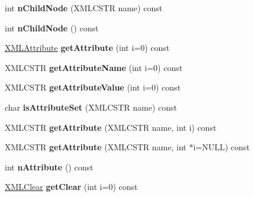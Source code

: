 \begin{DoxyCompactItemize}
\item 
\hypertarget{struct_x_m_l_node_a37dfb85db6b3e8974474c9a6277fff94}{}\label{struct_x_m_l_node_a37dfb85db6b3e8974474c9a6277fff94} 
int {\bfseries n\+Child\+Node} (X\+M\+L\+C\+S\+TR name) const
\item 
\hypertarget{struct_x_m_l_node_a89884092225798f347305956c1ecc62b}{}\label{struct_x_m_l_node_a89884092225798f347305956c1ecc62b} 
int {\bfseries n\+Child\+Node} () const
\item 
\hypertarget{struct_x_m_l_node_a50cc434e59c5f24f70eec2ae4b0554ab}{}\label{struct_x_m_l_node_a50cc434e59c5f24f70eec2ae4b0554ab} 
\hyperlink{struct_x_m_l_attribute}{X\+M\+L\+Attribute} {\bfseries get\+Attribute} (int i=0) const
\item 
\hypertarget{struct_x_m_l_node_a6710fba2ad2ca7c79c3e5d17a2101e08}{}\label{struct_x_m_l_node_a6710fba2ad2ca7c79c3e5d17a2101e08} 
X\+M\+L\+C\+S\+TR {\bfseries get\+Attribute\+Name} (int i=0) const
\item 
\hypertarget{struct_x_m_l_node_a48375d3bbdff5a0f416f668498edd3cb}{}\label{struct_x_m_l_node_a48375d3bbdff5a0f416f668498edd3cb} 
X\+M\+L\+C\+S\+TR {\bfseries get\+Attribute\+Value} (int i=0) const
\item 
\hypertarget{struct_x_m_l_node_a0bf031a1bca5c211810eb3420595589e}{}\label{struct_x_m_l_node_a0bf031a1bca5c211810eb3420595589e} 
char {\bfseries is\+Attribute\+Set} (X\+M\+L\+C\+S\+TR name) const
\item 
\hypertarget{struct_x_m_l_node_a5b66e8469c1f6c3398993e38981ead13}{}\label{struct_x_m_l_node_a5b66e8469c1f6c3398993e38981ead13} 
X\+M\+L\+C\+S\+TR {\bfseries get\+Attribute} (X\+M\+L\+C\+S\+TR name, int i) const
\item 
\hypertarget{struct_x_m_l_node_aed21862233be12773795cf6f3b9feeed}{}\label{struct_x_m_l_node_aed21862233be12773795cf6f3b9feeed} 
X\+M\+L\+C\+S\+TR {\bfseries get\+Attribute} (X\+M\+L\+C\+S\+TR name, int $\ast$i=N\+U\+LL) const
\item 
\hypertarget{struct_x_m_l_node_a7980a71afeab26b29c4f1c67659d4214}{}\label{struct_x_m_l_node_a7980a71afeab26b29c4f1c67659d4214} 
int {\bfseries n\+Attribute} () const
\item 
\hypertarget{struct_x_m_l_node_ae1fcdd6a5e7c33b8c3c42ceb695a8a92}{}\label{struct_x_m_l_node_ae1fcdd6a5e7c33b8c3c42ceb695a8a92} 
\hyperlink{struct_x_m_l_clear}{X\+M\+L\+Clear} {\bfseries get\+Clear} (int i=0) const
\item 
\hypertarget{struct_x_m_l_node_ac698d5a2e8e8eac2d212d84013c4b0e8}{}\label{struct_x_m_l_node_ac698d5a2e8e8eac2d212d84013c4b0e8} 

\end{DoxyCompactItemize}
